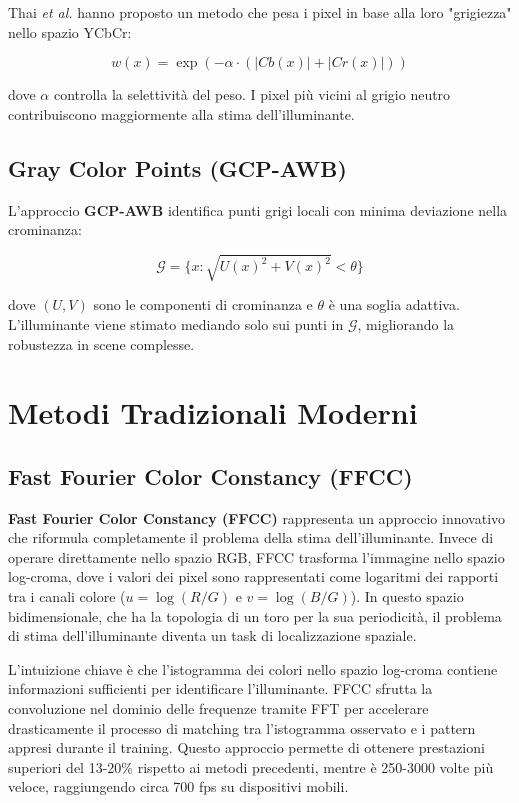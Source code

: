 Thai \textit{et al.} \cite{thai_fast_2016} hanno proposto un metodo che pesa i pixel in base alla loro "grigiezza" nello spazio YCbCr:

\begin{equation}
w(x) = \exp\left(-\alpha \cdot (|Cb(x)| + |Cr(x)|)\right)
\end{equation}

dove $\alpha$ controlla la selettività del peso. I pixel più vicini al grigio neutro contribuiscono maggiormente alla stima dell'illuminante.

\subsection{Gray Color Points (GCP-AWB)}

L'approccio \textbf{GCP-AWB} \cite{huo_robust_2006} identifica punti grigi locali con minima deviazione nella crominanza:

\begin{equation}
\mathcal{G} = \{x : \sqrt{U(x)^2 + V(x)^2} < \theta\}
\end{equation}

dove $(U, V)$ sono le componenti di crominanza e $\theta$ è una soglia adattiva. L'illuminante viene stimato mediando solo sui punti in $\mathcal{G}$, migliorando la robustezza in scene complesse.

\section{Metodi Tradizionali Moderni}

\subsection{Fast Fourier Color Constancy (FFCC)}

\textbf{Fast Fourier Color Constancy (FFCC)} \cite{barron_fast_2017} rappresenta un approccio innovativo che riformula completamente il problema della stima dell'illuminante. Invece di operare direttamente nello spazio RGB, FFCC trasforma l'immagine nello spazio log-croma, dove i valori dei pixel sono rappresentati come logaritmi dei rapporti tra i canali colore ($u = \log(R/G)$ e $v = \log(B/G)$). In questo spazio bidimensionale, che ha la topologia di un toro per la sua periodicità, il problema di stima dell'illuminante diventa un task di localizzazione spaziale.

L'intuizione chiave è che l'istogramma dei colori nello spazio log-croma contiene informazioni sufficienti per identificare l'illuminante. FFCC sfrutta la convoluzione nel dominio delle frequenze tramite FFT per accelerare drasticamente il processo di matching tra l'istogramma osservato e i pattern appresi durante il training. Questo approccio permette di ottenere prestazioni superiori del 13-20\% rispetto ai metodi precedenti, mentre è 250-3000 volte più veloce, raggiungendo circa 700 fps su dispositivi mobili.

